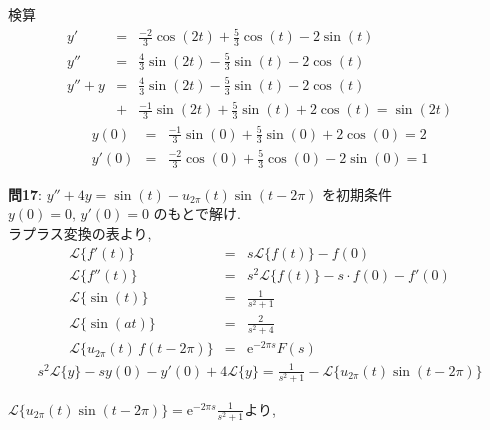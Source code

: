 ﻿\documentclass[a4j]{jarticle}
\begin{document}
検算
\begin{eqnarray*}
y'    &=& \frac{-2}{3}\cos(2t) + \frac{5}{3}\cos(t) - 2\sin(t) \\
y''   &=& \frac{4}{3}\sin(2t)  - \frac{5}{3}\sin(t) - 2\cos(t) \\
y''+y &=& \frac{4}{3}\sin(2t)  - \frac{5}{3}\sin(t) - 2\cos(t) \\
      &+& \frac{-1}{3}\sin(2t) + \frac{5}{3}\sin(t) + 2\cos(t) = \sin(2t)
\end{eqnarray*}
\begin{eqnarray*}
y(0)  &=& \frac{-1}{3}\sin(0) + \frac{5}{3}\sin(0) + 2\cos(0) = 2 \\
y'(0) &=& \frac{-2}{3}\cos(0) + \frac{5}{3}\cos(0) - 2\sin(0) = 1
\end{eqnarray*}

\noindent
{\large {\bf 問17}}: \(y''+4y=\sin(t)-u_{2\pi}(t)\sin(t-2\pi) \) を初期条件 \( y(0)=0 ,\, y'(0)=0 \) のもとで解け. \\

ラプラス変換の表より,
\begin{eqnarray*}
                \mathcal{L} \{  f'(t) \} &=& s \mathcal{L} \{  f(t) \} - f(0) \\
               \mathcal{L} \{  f''(t) \} &=& s^2 \mathcal{L} \{  f(t) \} - s\cdot f(0) -f'(0)\\
               \mathcal{L} \{ \sin(t) \} &=& \frac{1}{s^2 + 1} \\
              \mathcal{L} \{ \sin(at) \} &=& \frac{2}{s^2 + 4} \\
\mathcal{L} \{ u_{2\pi}(t)\,f(t-2\pi) \} &=& \mathrm{e}^{-2\pi s}F(s)
\end{eqnarray*}
\begin{eqnarray*}
s^2 \mathcal{L} \{ y \} - s y(0) - y'(0) + 4 \mathcal{L} \{ y \} = \frac{1}{s^2+1} - \mathcal{L} \{ u_{2\pi}(t)\sin(t-2\pi) \}
\end{eqnarray*}

\( \mathcal{L} \{ u_{2\pi}(t)\sin(t-2\pi) \} =  \mathrm{e}^{-2\pi s}\frac{1}{s^2+1} \)より,
\end{document}
